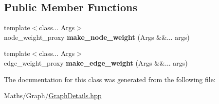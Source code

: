 \subsection*{Public Member Functions}
\begin{DoxyCompactItemize}
\item 
\mbox{\label{classsequoia_1_1maths_1_1graph__impl_1_1weight__maker_3_01_node_weight_pooling_00_01_edge_weightae6caf0d6d717c63a02de85d3731d5cd_a9592997468b6a10d024458db905c3f52}} 
{\footnotesize template$<$class... Args$>$ }\\node\+\_\+weight\+\_\+proxy {\bfseries make\+\_\+node\+\_\+weight} (Args \&\&... args)
\item 
\mbox{\label{classsequoia_1_1maths_1_1graph__impl_1_1weight__maker_3_01_node_weight_pooling_00_01_edge_weightae6caf0d6d717c63a02de85d3731d5cd_ab7c5add4020ef103910862ef870139c9}} 
{\footnotesize template$<$class... Args$>$ }\\edge\+\_\+weight\+\_\+proxy {\bfseries make\+\_\+edge\+\_\+weight} (Args \&\&... args)
\end{DoxyCompactItemize}


The documentation for this class was generated from the following file\+:\begin{DoxyCompactItemize}
\item 
Maths/\+Graph/\mbox{\hyperlink{_graph_details_8hpp}{Graph\+Details.\+hpp}}\end{DoxyCompactItemize}
